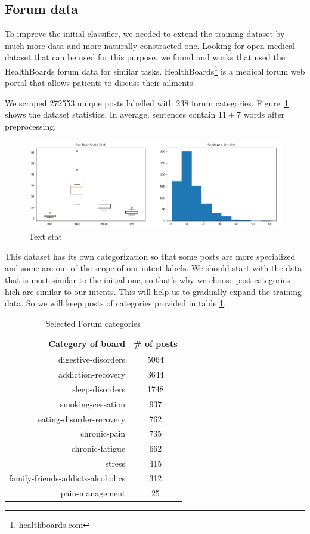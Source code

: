 \documentclass[11pt]{article}
\begin{document}
\subsection{Forum data}
\label{subsec:forumdata}

To improve the initial classifier, we needed to extend the training
dataset by much more data and more naturally constracted one. Looking
for open medical dataset that can be used for this purpose, we found
\cite{zhang2015} and \cite{sondhi-EtAl:2010:POSTERS} works that used
the HealthBoards forum data for similar tasks. 
HealthBoards\footnote{\url{healthboards.com}} is a medical forum web portal that
allows patients to discuss their ailments.


We scraped 272553 unique posts labelled with 238 forum
categories. Figure~\ref{forum_data_stat} shows the dataset
statistics. In average, sentences contain $11\pm7$ words after
preprocessing.


 \begin{figure}[h]
 	\centering
 	\includegraphics[scale=0.4]{report3.png}
	\caption{Text stat}\label{forum_data_stat}
 \end{figure}
\FloatBarrier

This dataset has its own categorization so that some posts are more specialized and some are out of the scope of our intent labels. We should start with the data that is most similar to the initial one, so that's why we choose post categories hich are similar to our intents. This will help us to gradually expand the training data. So we will keep posts of categories provided in table \ref{cat_freq}.

\begin{table}[htb]
\centering
\begin{tabular}{ |r|c| }
\hline
Category of board &  \# of posts \\ \hline
digestive-disorders & 5064 \\ \hline
addiction-recovery & 3644 \\ \hline
sleep-disorders & 1748 \\ \hline
smoking-cessation & 937 \\ \hline
eating-disorder-recovery & 762 \\ \hline
chronic-pain & 735 \\ \hline
chronic-fatigue & 662 \\ \hline
stress & 415 \\ \hline
family-friends-addicts-alcoholics & 312 \\ \hline
pain-management & 25 \\ \hline
\end{tabular}
\caption{Selected Forum categories}\label{cat_freq}
\end{table}
\FloatBarrier
\end{document}
